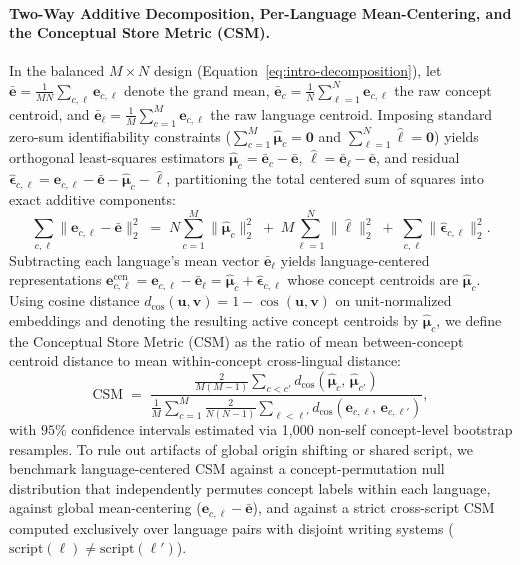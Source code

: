 \paragraph{Two-Way Additive Decomposition, Per-Language Mean-Centering, and the Conceptual Store Metric (CSM).}
In the balanced $M \times N$ design (Equation~\ref{eq:intro-decomposition}), let $\bar{\mathbf{e}} = \frac{1}{MN}\sum_{c,\ell}\mathbf{e}_{c,\ell}$ denote the grand mean, $\bar{\mathbf{e}}_c = \frac{1}{N}\sum_{\ell=1}^{N}\mathbf{e}_{c,\ell}$ the raw concept centroid, and $\bar{\mathbf{e}}_\ell = \frac{1}{M}\sum_{c=1}^{M}\mathbf{e}_{c,\ell}$ the raw language centroid.
Imposing standard zero-sum identifiability constraints ($\sum_{c=1}^{M}\hat{\boldsymbol{\mu}}_c = \mathbf{0}$ and $\sum_{\ell=1}^{N}\hat{\boldsymbol{\ell}} = \mathbf{0}$) yields orthogonal least-squares estimators $\hat{\boldsymbol{\mu}}_c = \bar{\mathbf{e}}_c - \bar{\mathbf{e}}$, $\hat{\boldsymbol{\ell}} = \bar{\mathbf{e}}_\ell - \bar{\mathbf{e}}$, and residual $\hat{\boldsymbol{\epsilon}}_{c,\ell} = \mathbf{e}_{c,\ell} - \bar{\mathbf{e}} - \hat{\boldsymbol{\mu}}_c - \hat{\boldsymbol{\ell}}$, partitioning the total centered sum of squares into exact additive components:
\begin{equation}
\sum_{c,\ell}\|\mathbf{e}_{c,\ell} - \bar{\mathbf{e}}\|_2^2 \;=\; N\sum_{c=1}^{M}\|\hat{\boldsymbol{\mu}}_c\|_2^2 \;+\; M\sum_{\ell=1}^{N}\|\hat{\boldsymbol{\ell}}\|_2^2 \;+\; \sum_{c,\ell}\|\hat{\boldsymbol{\epsilon}}_{c,\ell}\|_2^2.
\label{eq:ss-partition}
\end{equation}
Subtracting each language's mean vector $\bar{\mathbf{e}}_\ell$ yields language-centered representations $\mathbf{e}^{\text{cen}}_{c,\ell} = \mathbf{e}_{c,\ell} - \bar{\mathbf{e}}_\ell = \hat{\boldsymbol{\mu}}_c + \hat{\boldsymbol{\epsilon}}_{c,\ell}$ whose concept centroids are $\hat{\boldsymbol{\mu}}_c$.
Using cosine distance $d_{\cos}(\mathbf{u}, \mathbf{v}) = 1 - \cos(\mathbf{u}, \mathbf{v})$ on unit-normalized embeddings and denoting the resulting active concept centroids by $\hat{\boldsymbol{\mu}}_c$, we define the Conceptual Store Metric (CSM) as the ratio of mean between-concept centroid distance to mean within-concept cross-lingual distance:
\begin{equation}
\text{CSM} \;=\; \frac{\frac{2}{M(M-1)}\sum_{c < c'} d_{\cos}(\hat{\boldsymbol{\mu}}_c,\, \hat{\boldsymbol{\mu}}_{c'})}{\frac{1}{M}\sum_{c=1}^{M} \frac{2}{N(N-1)}\sum_{\ell < \ell'} d_{\cos}(\mathbf{e}_{c,\ell},\, \mathbf{e}_{c,\ell'})},
\label{eq:csm}
\end{equation}
with $95\%$ confidence intervals estimated via 1,000 non-self concept-level bootstrap resamples.
To rule out artifacts of global origin shifting or shared script, we benchmark language-centered CSM against a concept-permutation null distribution that independently permutes concept labels within each language, against global mean-centering ($\mathbf{e}_{c,\ell} - \bar{\mathbf{e}}$), and against a strict cross-script CSM computed exclusively over language pairs with disjoint writing systems ($\text{script}(\ell) \neq \text{script}(\ell')$).

